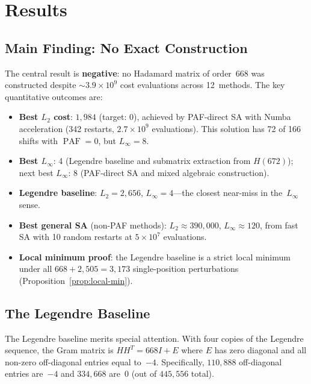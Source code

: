 \documentclass[11pt,a4paper]{article}
\newcommand{\Linf}{L_\infty}
\newcommand{\Ltwo}{L_2}
\DeclareMathOperator{\PAF}{PAF}
\begin{document}
\section{Results}\label{sec:results}

\subsection{Main Finding: No Exact Construction}

The central result is \textbf{negative}: no Hadamard matrix of order~668
was constructed despite $\sim\!3.9 \times 10^9$ cost evaluations across
12~methods.  The key quantitative outcomes are:
\begin{itemize}
  \item \textbf{Best $\Ltwo$ cost}: $1{,}984$ (target: 0), achieved by
    PAF-direct SA with Numba acceleration (342 restarts,
    $2.7 \times 10^9$ evaluations).  This solution has 72 of 166 shifts
    with $\PAF = 0$, but $\Linf = 8$.
  \item \textbf{Best $\Linf$}: 4 (Legendre baseline and submatrix
    extraction from $H(672)$); next best $\Linf$: 8 (PAF-direct SA and
    mixed algebraic construction).
  \item \textbf{Legendre baseline}: $\Ltwo = 2{,}656$, $\Linf = 4$---the
    closest near-miss in the~$\Linf$ sense.
  \item \textbf{Best general SA} (non-PAF methods):
    $\Ltwo \approx 390{,}000$, $\Linf \approx 120$, from fast SA with 10
    random restarts at $5 \times 10^7$ evaluations.
  \item \textbf{Local minimum proof}: the Legendre baseline is a strict
    local minimum under all $668 + 2{,}505 = 3{,}173$ single-position
    perturbations (Proposition~\ref{prop:local-min}).
\end{itemize}

\subsection{The Legendre Baseline}\label{sec:results:legendre}

The Legendre baseline merits special attention.  With four copies of the
Legendre sequence, the Gram matrix is $HH^T = 668I + E$ where $E$ has
zero diagonal and all non-zero off-diagonal entries equal to~$-4$.
Specifically, $110{,}888$ off-diagonal entries are~$-4$ and $334{,}668$
are~$0$ (out of $445{,}556$ total).
\end{document}
